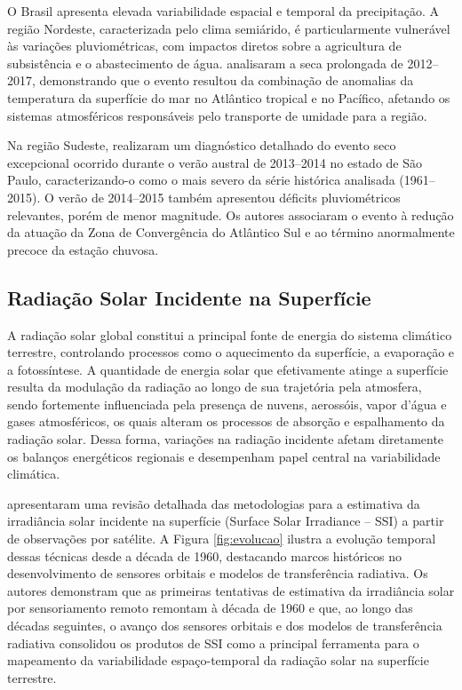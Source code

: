 O Brasil apresenta elevada variabilidade espacial e temporal da precipitação. A região Nordeste, caracterizada pelo clima semiárido, é particularmente vulnerável às variações pluviométricas, com impactos diretos sobre a agricultura de subsistência e o abastecimento de água. \cite{marengo2017} analisaram a seca prolongada de 2012--2017, demonstrando que o evento resultou da combinação de anomalias da temperatura da superfície do mar no Atlântico tropical e no Pacífico, afetando os sistemas atmosféricos responsáveis pelo transporte de umidade para a região.

Na região Sudeste, \cite{coelho2016} realizaram um diagnóstico detalhado do evento seco excepcional ocorrido durante o verão austral de 2013--2014 no estado de São Paulo, caracterizando-o como o mais severo da série histórica analisada (1961--2015). O verão de 2014--2015 também apresentou déficits pluviométricos relevantes, porém de menor magnitude. Os autores associaram o evento à redução da atuação da Zona de Convergência do Atlântico Sul e ao término anormalmente precoce da estação chuvosa.

\subsection{Radiação Solar Incidente na Superfície}

A radiação solar global constitui a principal fonte de energia do sistema climático terrestre, controlando processos como o aquecimento da superfície, a evaporação e a fotossíntese. A quantidade de energia solar que efetivamente atinge a superfície resulta da modulação da radiação ao longo de sua trajetória pela atmosfera, sendo fortemente influenciada pela presença de nuvens, aerossóis, vapor d’água e gases atmosféricos, os quais alteram os processos de absorção e espalhamento da radiação solar. Dessa forma, variações na radiação incidente afetam diretamente os balanços energéticos regionais e desempenham papel central na variabilidade climática.

\cite{wang2008} apresentaram uma revisão detalhada das metodologias para a estimativa da irradiância solar incidente na superfície (Surface Solar Irradiance – SSI) a partir de observações por satélite. A Figura \ref{fig:evolucao} ilustra a evolução temporal dessas técnicas desde a década de 1960, destacando marcos históricos no desenvolvimento de sensores orbitais e modelos de transferência radiativa. Os autores demonstram que as primeiras tentativas de estimativa da irradiância solar por sensoriamento remoto remontam à década de 1960 e que, ao longo das décadas seguintes, o avanço dos sensores orbitais e dos modelos de transferência radiativa consolidou os produtos de SSI como a principal ferramenta para o mapeamento da variabilidade espaço-temporal da radiação solar na superfície terrestre.

